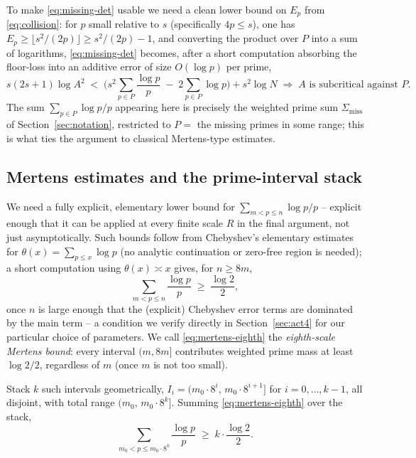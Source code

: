 \documentclass[11pt]{amsart}
\theoremstyle{definition}
\theoremstyle{remark}
\begin{document}
To make \eqref{eq:missing-det} usable we need a clean lower bound on $E_p$ from \eqref{eq:collision}: for $p$ small relative to $s$ (specifically $4p\le s$), one has $E_p \ge \lfloor s^2/(2p)\rfloor \ge s^2/(2p) - 1$, and converting the product over $P$ into a sum of logarithms, \eqref{eq:missing-det} becomes, after a short computation absorbing the floor-loss into an additive error of size $O(\log p)$ per prime,
\begin{equation}\label{eq:log-missing}
s(2s+1)\log A^2 \;<\; \Big(s^2 \!\sum_{p\in P}\frac{\log p}{p} \;-\; 2\!\sum_{p\in P}\log p\Big) + s^2\log N
\;\Longrightarrow\; A \text{ is subcritical against } P.
\end{equation}
The sum $\sum_{p\in P} \log p / p$ appearing here is precisely the weighted prime sum $\Sigma_{\mathrm{miss}}$ of Section~\ref{sec:notation}, restricted to $P=$ the missing primes in some range; this is what ties the argument to classical Mertens-type estimates.

\subsection{Mertens estimates and the prime-interval stack}

We need a fully explicit, elementary lower bound for $\sum_{m<p\le n}\log p/p$ -- explicit enough that it can be applied at every finite scale $R$ in the final argument, not just asymptotically. Such bounds follow from Chebyshev's elementary estimates for $\theta(x)=\sum_{p\le x}\log p$ (no analytic continuation or zero-free region is needed); a short computation using $\theta(x) \asymp x$ gives, for $n\ge 8m$,
\begin{equation}\label{eq:mertens-eighth}
\sum_{m<p\le n} \frac{\log p}{p} \;\ge\; \frac{\log 2}{2},
\end{equation}
once $n$ is large enough that the (explicit) Chebyshev error terms are dominated by the main term -- a condition we verify directly in Section~\ref{sec:act4} for our particular choice of parameters. We call \eqref{eq:mertens-eighth} the \emph{eighth-scale Mertens bound}: every interval $(m,8m]$ contributes weighted prime mass at least $\log 2/2$, regardless of $m$ (once $m$ is not too small).

Stack $k$ such intervals geometrically, $I_i = (m_0\cdot 8^i,\, m_0\cdot 8^{i+1}]$ for $i=0,\dots,k-1$, all disjoint, with total range $(m_0,\,m_0\cdot 8^k]$. Summing \eqref{eq:mertens-eighth} over the stack,
\begin{equation}\label{eq:mertens-stack}
\sum_{m_0<p\le m_0\cdot 8^k} \frac{\log p}{p} \;\ge\; k\cdot \frac{\log 2}{2}.
\end{equation}
\end{document}
